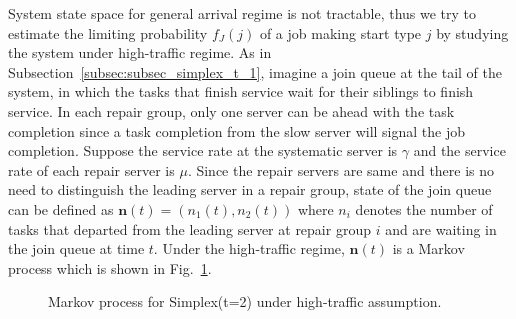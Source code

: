 \documentclass[sigconf,draft]{acmart}
\begin{document}
System state space for general arrival regime is not tractable, thus we try to estimate the limiting probability $f_J(j)$ of a job making start type $j$ by studying the system under high-traffic regime. As in Subsection~\ref{subsec:subsec_simplex_t_1}, imagine a join queue at the tail of the system, in which the tasks that finish service wait for their siblings to finish service. In each repair group, only one server can be ahead with the task completion since a task completion from the slow server will signal the job completion. Suppose the service rate at the systematic server is $\gamma$ and the service rate of each repair server is $\mu$. Since the repair servers are same and there is no need to distinguish the leading server in a repair group, state of the join queue can be defined as $\bm{n}(t) = (n_1(t), n_2(t))$ where $n_i$ denotes the number of tasks that departed from the leading server at repair group $i$ and are waiting in the join queue at time $t$. Under the high-traffic regime, $\bm{n}(t)$ is a Markov process which is shown in Fig.~\ref{fig:fig_simplex_t_2_mp_high_traff}. 
\begin{figure}[htb]
  \centering
  \vspace*{-0.2cm}
  \caption{Markov process for Simplex(t=2) under high-traffic assumption.}
  \label{fig:fig_simplex_t_2_mp_high_traff}
\end{figure}
\end{document}
